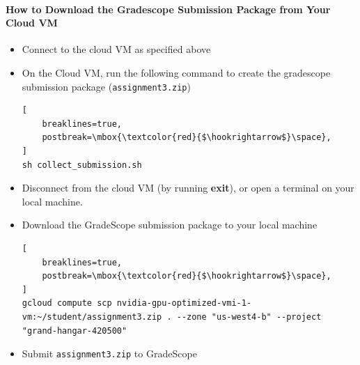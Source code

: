 \paragraph{How to Download the Gradescope Submission Package from Your Cloud VM}
\begin{itemize}
    \item Connect to the cloud VM as specified above
    \item On the Cloud VM, run the following command to create the gradescope submission package (\texttt{assignment3.zip})
\begin{lstlisting}[
    breaklines=true,
    postbreak=\mbox{\textcolor{red}{$\hookrightarrow$}\space},
]
sh collect_submission.sh 
\end{lstlisting}

    \item Disconnect from the cloud VM (by running \textbf{exit}), or open a terminal on your local machine. 
    \item Download the GradeScope submission package to your local machine
\begin{lstlisting}[
    breaklines=true,
    postbreak=\mbox{\textcolor{red}{$\hookrightarrow$}\space},
]
gcloud compute scp nvidia-gpu-optimized-vmi-1-vm:~/student/assignment3.zip . --zone "us-west4-b" --project "grand-hangar-420500"
\end{lstlisting}

    \item Submit  \texttt{assignment3.zip} to GradeScope
\end{itemize}